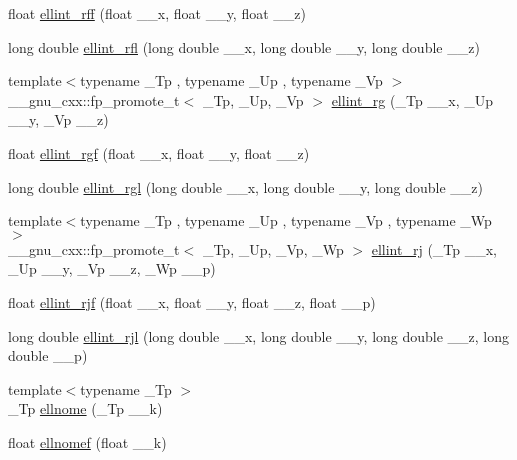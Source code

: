 \begin{DoxyCompactItemize}
float \hyperlink{group__gnu__math__spec__func_ga39acf5c69a85f9b687478b32847156da}{ellint\+\_\+rff} (float \+\_\+\+\_\+x, float \+\_\+\+\_\+y, float \+\_\+\+\_\+z)
\item 
long double \hyperlink{group__gnu__math__spec__func_ga38dd36b3db5bbe5da516d0cbe3ff1f21}{ellint\+\_\+rfl} (long double \+\_\+\+\_\+x, long double \+\_\+\+\_\+y, long double \+\_\+\+\_\+z)
\item 
{\footnotesize template$<$typename \+\_\+\+Tp , typename \+\_\+\+Up , typename \+\_\+\+Vp $>$ }\\\+\_\+\+\_\+gnu\+\_\+cxx\+::fp\+\_\+promote\+\_\+t$<$ \+\_\+\+Tp, \+\_\+\+Up, \+\_\+\+Vp $>$ \hyperlink{group__gnu__math__spec__func_gadf618529d6106c1c1bc1e9212c4fed12}{ellint\+\_\+rg} (\+\_\+\+Tp \+\_\+\+\_\+x, \+\_\+\+Up \+\_\+\+\_\+y, \+\_\+\+Vp \+\_\+\+\_\+z)
\item 
float \hyperlink{group__gnu__math__spec__func_ga7a4ab348bf312a3425501ac8a3d16494}{ellint\+\_\+rgf} (float \+\_\+\+\_\+x, float \+\_\+\+\_\+y, float \+\_\+\+\_\+z)
\item 
long double \hyperlink{group__gnu__math__spec__func_ga563455d515ed845988552432108a21be}{ellint\+\_\+rgl} (long double \+\_\+\+\_\+x, long double \+\_\+\+\_\+y, long double \+\_\+\+\_\+z)
\item 
{\footnotesize template$<$typename \+\_\+\+Tp , typename \+\_\+\+Up , typename \+\_\+\+Vp , typename \+\_\+\+Wp $>$ }\\\+\_\+\+\_\+gnu\+\_\+cxx\+::fp\+\_\+promote\+\_\+t$<$ \+\_\+\+Tp, \+\_\+\+Up, \+\_\+\+Vp, \+\_\+\+Wp $>$ \hyperlink{group__gnu__math__spec__func_gadccabc8df929cc03745286ed1574a3ba}{ellint\+\_\+rj} (\+\_\+\+Tp \+\_\+\+\_\+x, \+\_\+\+Up \+\_\+\+\_\+y, \+\_\+\+Vp \+\_\+\+\_\+z, \+\_\+\+Wp \+\_\+\+\_\+p)
\item 
float \hyperlink{group__gnu__math__spec__func_gace85b5190b04f57493878c5d672cfabd}{ellint\+\_\+rjf} (float \+\_\+\+\_\+x, float \+\_\+\+\_\+y, float \+\_\+\+\_\+z, float \+\_\+\+\_\+p)
\item 
long double \hyperlink{group__gnu__math__spec__func_gab5405f1669b3ce8b560dc33aa5b97287}{ellint\+\_\+rjl} (long double \+\_\+\+\_\+x, long double \+\_\+\+\_\+y, long double \+\_\+\+\_\+z, long double \+\_\+\+\_\+p)
\item 
{\footnotesize template$<$typename \+\_\+\+Tp $>$ }\\\+\_\+\+Tp \hyperlink{group__gnu__math__spec__func_ga7bfb34f8b5c0ed7c72040f9cb7034bba}{ellnome} (\+\_\+\+Tp \+\_\+\+\_\+k)
\item 
float \hyperlink{group__gnu__math__spec__func_gad3ba08e5843ea0ec2bb9ddde3033adff}{ellnomef} (float \+\_\+\+\_\+k)

\end{DoxyCompactItemize}

